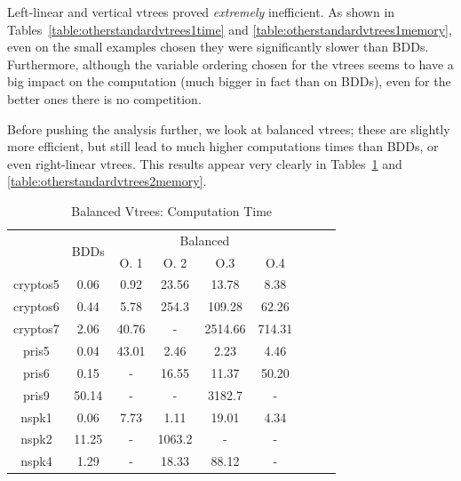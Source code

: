 \documentclass[11pt]{article}
\begin{document}
Left-linear and vertical vtrees proved \textit{extremely} inefficient. As shown in Tables~\ref{table:otherstandardvtrees1time} and \ref{table:otherstandardvtrees1memory}, even on the small examples chosen they were significantly slower than BDDs. Furthermore, although the variable ordering chosen for the vtrees seems to have a big impact on the computation (much bigger in fact than on BDDs), even for the better ones there is no competition.  

Before pushing the analysis further, we look at balanced vtrees; these are slightly more efficient, but still lead to much higher computations times than BDDs, or even right-linear vtrees. This results appear very clearly in Tables~\ref{table:otherstandardvtrees2time} and \ref{table:otherstandardvtrees2memory}.
\label{balanced_comparisons}
\begin{table}
\centering
\begin{tabular}{|*{9}{c|}}
\hline
 & \multirow{2}{*}{BDDs} & \multicolumn{4}{c|}{Balanced} \\ \cline{3-6}
 & & O. 1& O. 2 & O.3 & O.4 \\ \hline
cryptos5 & 0.06& 0.92 & 23.56 & 13.78 & 8.38\\ \hline
cryptos6 & 0.44 & 5.78 & 254.3& 109.28 & 62.26\\ \hline
cryptos7 & 2.06& 40.76 & - & 2514.66 & 714.31 \\ \hline
pris5 & 0.04 & 43.01 & 2.46& 2.23 & 4.46 \\ \hline
pris6 & 0.15 & - & 16.55 & 11.37 & 50.20 \\ \hline
pris9 & 50.14 & - & - & 3182.7& - \\ \hline
nspk1 &0.06 & 7.73 & 1.11 & 19.01 & 4.34 \\ \hline
nspk2 &11.25 & - & 1063.2 &- & - \\ \hline
nspk4 & 1.29& - & 18.33 & 88.12& -\\ \hline
\end{tabular}
\caption{Balanced Vtrees: Computation Time}
\label{table:otherstandardvtrees2time}
\end{table}
\end{document}
